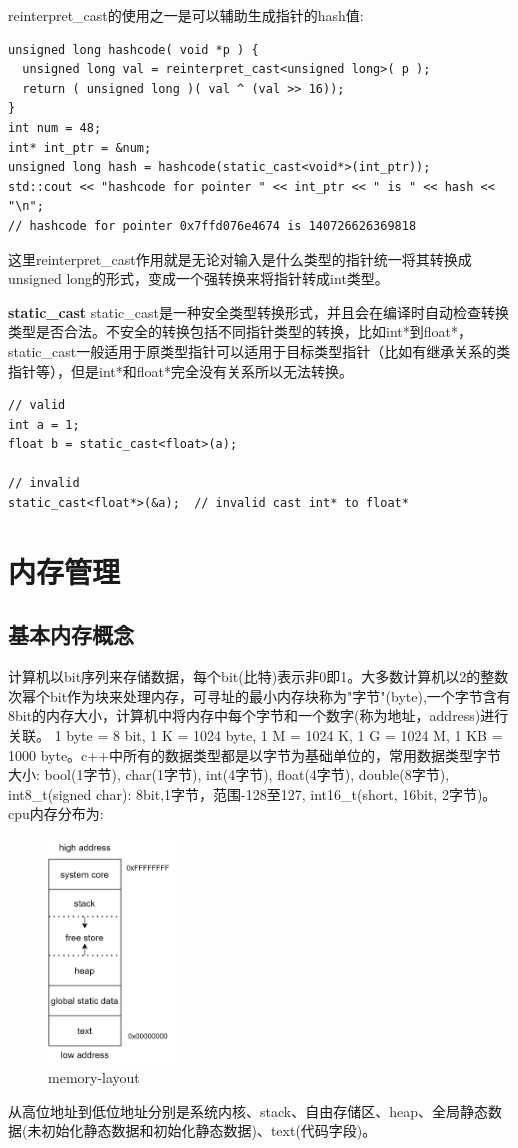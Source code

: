 \documentclass[12pt]{book}
\begin{document}
reinterpret\_cast的使用之一是可以辅助生成指针的hash值:
\begin{lstlisting}
unsigned long hashcode( void *p ) {
  unsigned long val = reinterpret_cast<unsigned long>( p );
  return ( unsigned long )( val ^ (val >> 16));
}
int num = 48;
int* int_ptr = &num;
unsigned long hash = hashcode(static_cast<void*>(int_ptr));
std::cout << "hashcode for pointer " << int_ptr << " is " << hash << "\n";
// hashcode for pointer 0x7ffd076e4674 is 140726626369818
\end{lstlisting}
这里reinterpret\_cast作用就是无论对输入是什么类型的指针统一将其转换成unsigned long的形式，变成一个强转换来将指针转成int类型。

\textbf{static\_cast} \newline
static\_cast是一种安全类型转换形式，并且会在编译时自动检查转换类型是否合法。不安全的转换包括不同指针类型的转换，比如int*到float*，static\_cast一般适用于原类型指针可以适用于目标类型指针（比如有继承关系的类指针等），但是int*和float*完全没有关系所以无法转换。
\begin{lstlisting}
// valid
int a = 1;
float b = static_cast<float>(a);

// invalid
static_cast<float*>(&a);  // invalid cast int* to float*
\end{lstlisting}

\section{内存管理}
\subsection{基本内存概念}
计算机以bit序列来存储数据，每个bit(比特)表示非0即1。大多数计算机以2的整数次幂个bit作为块来处理内存，可寻址的最小内存块称为"字节"(byte),一个字节含有8bit的内存大小，计算机中将内存中每个字节和一个数字(称为地址，address)进行关联。
1 byte = 8 bit, 1 K = 1024 byte, 1 M = 1024 K, 1 G = 1024 M, 1 KB = 1000 byte。c++中所有的数据类型都是以字节为基础单位的，常用数据类型字节大小: bool(1字节), char(1字节), int(4字节), float(4字节), double(8字节), int8\_t(signed char): 8bit,1字节，范围-128至127, int16\_t(short, 16bit, 2字节)。\newline
cpu内存分布为:
\begin{figure}[H]
\centering
\includegraphics[width=0.3\textwidth]{images/memory.png}
\caption{memory-layout}
\label{memory-layout}
\end{figure}
从高位地址到低位地址分别是系统内核、stack、自由存储区、heap、全局静态数据(未初始化静态数据和初始化静态数据)、text(代码字段)。
\end{document}
